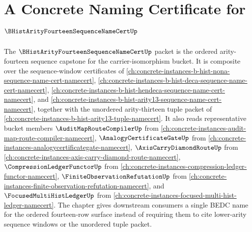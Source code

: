\chapter{A Concrete Naming Certificate for $\BHistArityFourteenSequenceNameCertUp$}
\label{ch:concrete-instances-b-hist-arity14-sequence-name-cert-namecert}

The $\BHistArityFourteenSequenceNameCertUp$ packet is the ordered arity-fourteen sequence capstone for the carrier-isomorphism bucket. It is composite over the sequence-window certificates of \autoref{ch:concrete-instances-b-hist-nona-sequence-name-cert-namecert}, \autoref{ch:concrete-instances-b-hist-deca-sequence-name-cert-namecert}, \autoref{ch:concrete-instances-b-hist-hendeca-sequence-name-cert-namecert}, and \autoref{ch:concrete-instances-b-hist-arity13-sequence-name-cert-namecert}, together with the unordered arity-thirteen tuple packet of \autoref{ch:concrete-instances-b-hist-arity13-tuple-namecert}. It also reads representative bucket members $\AuditMapRouteCompilerUp$ from \autoref{ch:concrete-instances-audit-map-route-compiler-namecert}, $\AnalogyCertificateGateUp$ from \autoref{ch:concrete-instances-analogycertificategate-namecert}, $\AxisCarryDiamondRouteUp$ from \autoref{ch:concrete-instances-axis-carry-diamond-route-namecert}, $\CompressionLedgerFunctorUp$ from \autoref{ch:concrete-instances-compression-ledger-functor-namecert}, $\FiniteObservationRefutationUp$ from \autoref{ch:concrete-instances-finite-observation-refutation-namecert}, and $\FocusedMultiHistLedgerUp$ from \autoref{ch:concrete-instances-focused-multi-hist-ledger-namecert}. The chapter gives downstream consumers a single BEDC name for the ordered fourteen-row surface instead of requiring them to cite lower-arity sequence windows or the unordered tuple packet.

